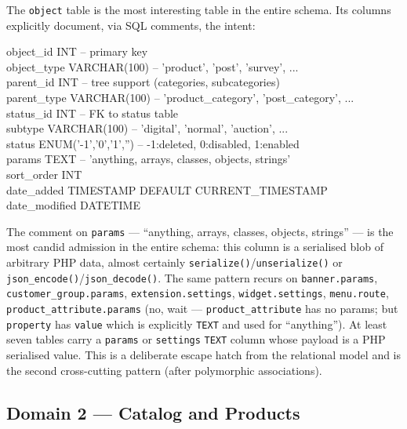\documentclass[11pt,a4paper]{article}
\begin{document}
The \texttt{object} table is the most interesting table in the entire
schema. Its columns explicitly document, via SQL comments, the intent:

\begin{tcolorbox}[enhanced,colback=nodefillgray,colframe=black!40,boxrule=0.3pt,arc=2pt,left=8pt,right=8pt,top=4pt,bottom=4pt,fontupper=\small\ttfamily]
object\_id      INT         -- primary key\\
object\_type    VARCHAR(100) -- 'product', 'post', 'survey', ...\\
parent\_id      INT          -- tree support (categories, subcategories)\\
parent\_type    VARCHAR(100) -- 'product\_category', 'post\_category', ...\\
status\_id      INT          -- FK to status table\\
subtype        VARCHAR(100) -- 'digital', 'normal', 'auction', ...\\
status         ENUM('-1','0','1','')  -- -1:deleted, 0:disabled, 1:enabled\\
params         TEXT         -- 'anything, arrays, classes, objects, strings'\\
sort\_order    INT\\
date\_added    TIMESTAMP DEFAULT CURRENT\_TIMESTAMP\\
date\_modified DATETIME
\end{tcolorbox}

The comment on \texttt{params} --- ``anything, arrays, classes, objects,
strings'' --- is the most candid admission in the entire schema: this
column is a serialised blob of arbitrary PHP data, almost certainly
\texttt{serialize()}/\texttt{unserialize()} or
\texttt{json\_encode()}/\texttt{json\_decode()}. The same pattern
recurs on \texttt{banner.params}, \texttt{customer\_group.params},
\texttt{extension.settings}, \texttt{widget.settings},
\texttt{menu.route}, \texttt{product\_attribute.params} (no, wait ---
\texttt{product\_attribute} has no params; but \texttt{property}
has \texttt{value} which is explicitly \texttt{TEXT} and used for
``anything''). At least seven tables carry a \texttt{params} or
\texttt{settings} \texttt{TEXT} column whose payload is a PHP
serialised value. This is a deliberate escape hatch from the
relational model and is the second cross-cutting pattern (after
polymorphic associations).

\subsection{Domain 2 --- Catalog and Products}\label{sec:catalog}
\end{document}
